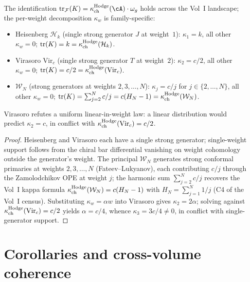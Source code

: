 \begin{proposition}
\label{prop:theoremD-weight-distribution}
\ClaimStatusProvedHere
The identification
$\operatorname{tr}_\mathcal{F}(K) = \kappaChHodge(\cA) \cdot \omega_g$
holds across the Vol~I landscape; the per-weight decomposition
$\kappa_w$ is family-specific:
\begin{itemize}
\item Heisenberg $\mathcal{H}_k$ (single strong generator $J$ at
 weight~$1$): $\kappa_1 = k$, all other $\kappa_w = 0$;
 $\operatorname{tr}(K) = k = \kappa_{\mathrm{ch}}^{\mathrm{Hodge}}(\mathcal{H}_k)$.
\item Virasoro $\mathrm{Vir}_c$ (single strong generator $T$ at
 weight~$2$): $\kappa_2 = c/2$, all other $\kappa_w = 0$;
 $\operatorname{tr}(K) = c/2 = \kappa_{\mathrm{ch}}^{\mathrm{Hodge}}(\mathrm{Vir}_c)$.
\item $\mathcal{W}_N$ (strong generators at weights
 $2, 3, \ldots, N$): $\kappa_j = c/j$ for
 $j \in \{2, \ldots, N\}$, all other $\kappa_w = 0$;
 $\operatorname{tr}(K) = \sum_{j=2}^N c/j = c(H_N - 1) =
 \kappa_{\mathrm{ch}}^{\mathrm{Hodge}}(\mathcal{W}_N)$.
\end{itemize}
Virasoro refutes a uniform linear-in-weight law: a linear
distribution would predict $\kappa_2 = c$, in conflict with
$\kappa_{\mathrm{ch}}^{\mathrm{Hodge}}(\mathrm{Vir}_c) = c/2$.
\end{proposition}

\begin{proof}[Proof]
Heisenberg and Virasoro each have a single strong generator;
single-weight support follows from the chiral bar differential
vanishing on weight cohomology outside the generator's weight. The
principal $\mathcal{W}_N$ generates strong conformal primaries at
weights $2, 3, \ldots, N$ (Fateev--Lukyanov), each contributing
$c/j$ through the Zamolodchikov OPE at weight $j$; the harmonic
sum $\sum_{j=2}^N c/j$ recovers the Vol~I kappa formula
$\kappa_{\mathrm{ch}}^{\mathrm{Hodge}}(\mathcal{W}_N) = c(H_N - 1)$ with
$H_N = \sum_{j=1}^N 1/j$ (C4 of the Vol~I census). Substituting
$\kappa_w = \alpha w$ into Virasoro gives $\kappa_2 = 2\alpha$;
solving against $\kappa_{\mathrm{ch}}^{\mathrm{Hodge}}(\mathrm{Vir}_c) = c/2$ yields
$\alpha = c/4$, whence $\kappa_3 = 3c/4 \neq 0$, in conflict with
single-generator support.
\end{proof}

\section{Corollaries and cross-volume coherence}
\label{sec:theorems-C-D-cross-volume}

